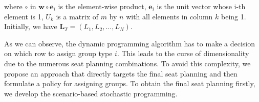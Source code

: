 where $\circ$ in $\mathbf{w} \circ \mathbf{e}_{i}$ is the element-wise product, $\mathbf{e}_{i}$ is the unit vector whose i-th element is 1, $U_k$ is a matrix of $m$ by $n$ with all elements in column $k$ being 1.  Initially, we have $\mathbf{L}_{T} = (L_1, L_2, \ldots, L_{N})$. 


As we can observe, the dynamic programming algorithm has to make a decision on which row to assign group type $i$. This leads to the curse of dimensionality due to the numerous seat planning combinations. To avoid this complexity, we propose an approach that directly targets the final seat planning and then formulate a policy for assigning groups. To obtain the final seat planning firstly, we develop the scenario-based stochastic programming.









